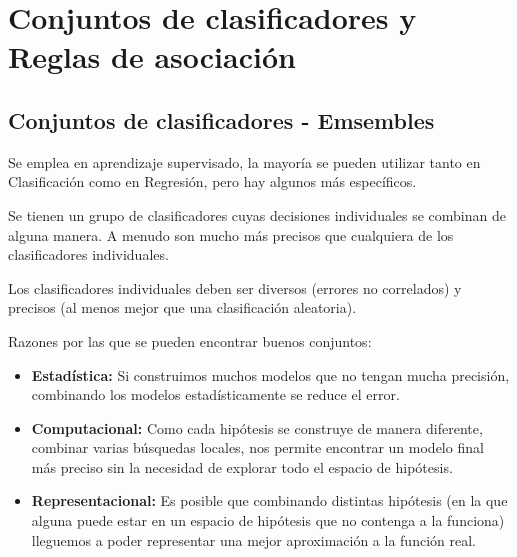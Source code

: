 \documentclass[12pt]{report} %
\begin{document}
\chapter{Conjuntos de clasificadores y Reglas de asociación}
\section{Conjuntos de clasificadores - Emsembles}
Se emplea en aprendizaje supervisado, la mayoría se pueden utilizar tanto en Clasificación como en Regresión, pero hay algunos más específicos.

Se tienen un grupo de clasificadores cuyas decisiones individuales se combinan de alguna manera. A menudo son mucho más precisos que cualquiera de los clasificadores individuales.

Los clasificadores individuales deben ser diversos (errores no correlados) y precisos (al menos mejor que una clasificación aleatoria).

Razones por las que se pueden encontrar buenos conjuntos:
\begin{itemize}
  \item \textbf{Estadística:} Si construimos muchos modelos que no tengan mucha precisión, combinando los modelos estadísticamente se reduce el error.
  \item \textbf{Computacional:} Como cada hipótesis se construye de manera diferente, combinar varias búsquedas locales, nos permite encontrar un modelo final más preciso sin la necesidad de explorar todo el espacio de hipótesis.
  \item \textbf{Representacional:} Es posible que combinando distintas hipótesis (en la que alguna puede estar en un espacio de hipótesis que no contenga a la funciona) lleguemos a poder representar una mejor aproximación a la función real.
\end{itemize}
\end{document}
